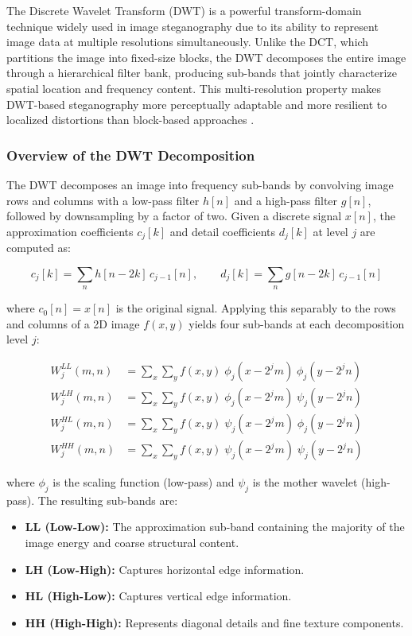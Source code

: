\documentclass[12pt,a4paper,oneside]{report}
\begin{document}
	The Discrete Wavelet Transform (DWT) is a powerful transform-domain technique widely used in image steganography due to its ability to represent image data at multiple resolutions simultaneously. Unlike the DCT, which partitions the image into fixed-size blocks, the DWT decomposes the entire image through a hierarchical filter bank, producing sub-bands that jointly characterize spatial location and frequency content. This multi-resolution property makes DWT-based steganography more perceptually adaptable and more resilient to localized distortions than block-based approaches \cite{mallat1999wavelet, chen2006dwt}.
	
	\subsubsection{Overview of the DWT Decomposition}
	
	The DWT decomposes an image into frequency sub-bands by convolving image rows and columns with a low-pass filter $h[n]$ and a high-pass filter $g[n]$, followed by downsampling by a factor of two. Given a discrete signal $x[n]$, the approximation coefficients $c_j[k]$ and detail coefficients $d_j[k]$ at level $j$ are computed as:
	
	\begin{equation}
		c_j[k] = \sum_{n} h[n - 2k]\, c_{j-1}[n], \qquad d_j[k] = \sum_{n} g[n - 2k]\, c_{j-1}[n]
	\end{equation}
	
	where $c_0[n] = x[n]$ is the original signal. Applying this separably to the rows and columns of a 2D image $f(x,y)$ yields four sub-bands at each decomposition level $j$:
	
	\begin{align}
		W^{LL}_j(m,n) &= \sum_{x}\sum_{y} f(x,y)\; \phi_j(x - 2^j m)\; \phi_j(y - 2^j n) \\
		W^{LH}_j(m,n) &= \sum_{x}\sum_{y} f(x,y)\; \phi_j(x - 2^j m)\; \psi_j(y - 2^j n) \\
		W^{HL}_j(m,n) &= \sum_{x}\sum_{y} f(x,y)\; \psi_j(x - 2^j m)\; \phi_j(y - 2^j n) \\
		W^{HH}_j(m,n) &= \sum_{x}\sum_{y} f(x,y)\; \psi_j(x - 2^j m)\; \psi_j(y - 2^j n)
	\end{align}
	
	where $\phi_j$ is the scaling function (low-pass) and $\psi_j$ is the mother wavelet (high-pass). The resulting sub-bands are:
	\begin{itemize}
		\item \textbf{LL (Low-Low):} The approximation sub-band containing the majority of the image energy and coarse structural content.
		\item \textbf{LH (Low-High):} Captures horizontal edge information.
		\item \textbf{HL (High-Low):} Captures vertical edge information.
		\item \textbf{HH (High-High):} Represents diagonal details and fine texture components.
	\end{itemize}
	
\end{document}
